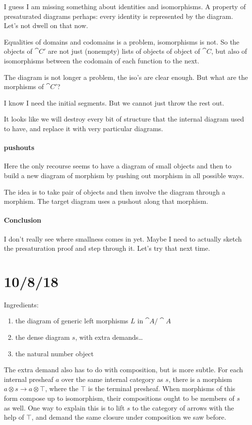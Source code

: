 \documentclass[csh.tex]{subfiles}
\begin{document}
I guess I am missing something about identities and isomorphisms. A property of presaturated diagrams perhaps: every identity is represented by the diagram. Let's not dwell on that now.

Equalities of domains and codomains is a problem, isomorphisms is not. So the objects of $\cat C'$ are not just (nonempty) lists of objects of object of $\cat C$, but also of isomorphisms between the codomain of each function to the next.

The diagram is not longer a problem, the iso's are clear enough. But what are the morphisms of $\cat C'$? 

I know I need the initial segments. But we cannot just throw the rest out.

It looks like we will destroy every bit of structure that the internal diagram used to have, and replace it with very particular diagrams.

\paragraph{pushouts}
Here the only recourse seems to have a diagram of small objects and then to build a new diagram of morphism by pushing out morphism in all possible ways.

The idea is to take pair of objects and then involve the diagram through a morphism. The target diagram uses a pushout along that morphism.

\paragraph{Conclusion}
I don't really see where smallness comes in yet. Maybe I need to actually sketch the presaturation proof and step through it. Let's try that next time.

\section{10/8/18}

Ingredients:
\begin{enumerate}
\item the diagram of generic left morphisms $L$ in $\cat A/\cat A$
\item the dense diagram $s$, with extra demands\dots
\item the natural number object
\end{enumerate}
The extra demand also has to do with composition, but is more subtle. For each internal presheaf $a$ over the same internal category as $s$, there is a morphism $a\otimes s\to a\otimes \top$, where the $\top$ is the terminal presheaf. When morphisms of this form compose up to isomorphism, their compositions ought to be members of $s$ as well. One way to explain this is to lift $s$ to the category of arrows with the help of $\top$, and demand the same closure under composition we saw before.
\end{document}

